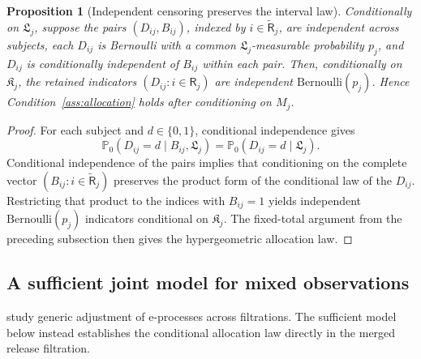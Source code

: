 \documentclass[12pt]{article}
\newtheorem{proposition}[theorem]{Proposition}
\theoremstyle{definition}
\theoremstyle{remark}
\begin{document}
\begin{proposition}[Independent censoring preserves the interval law]
\label{prop:right-censor}
Conditionally on $\mathfrak L_j$, suppose the pairs $(D_{ij},B_{ij})$, indexed by $i\in\widetilde{\mathsf R}_j$, are independent across subjects, each $D_{ij}$ is Bernoulli with a common $\mathfrak L_j$-measurable probability $p_j$, and $D_{ij}$ is conditionally independent of $B_{ij}$ within each pair. Then, conditionally on $\mathfrak K_j$, the retained indicators $(D_{ij}:i\in\mathsf R_j)$ are independent $\mathrm{Bernoulli}(p_j)$. Hence Condition~\ref{ass:allocation} holds after conditioning on $M_j$.
\end{proposition}

\begin{proof}
For each subject and $d\in\{0,1\}$, conditional independence gives
\[
 \mathbb P_0\left(D_{ij}=d\mid B_{ij},\mathfrak L_j\right)
 =\mathbb P_0\left(D_{ij}=d\mid\mathfrak L_j\right).
\]
Conditional independence of the pairs implies that conditioning on the complete vector $(B_{ij}:i\in\widetilde{\mathsf R}_j)$ preserves the product form of the conditional law of the $D_{ij}$. Restricting that product to the indices with $B_{ij}=1$ yields independent $\mathrm{Bernoulli}(p_j)$ indicators conditional on $\mathfrak K_j$. The fixed-total argument from the preceding subsection then gives the hypergeometric allocation law.
\end{proof}

\subsection{A sufficient joint model for mixed observations}

\citet{ChoeRamdas2026} study generic adjustment of e-processes across filtrations. The sufficient model below instead establishes the conditional allocation law directly in the merged release filtration.
\end{document}
